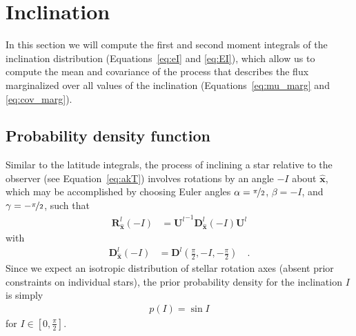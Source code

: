 \documentclass[modern]{aastex62}
\begin{document}
\section{Inclination}
\label{sec:inc}

In this section we will compute the first and second moment integrals of the
inclination distribution (Equations~\ref{eq:eI} and \ref{eq:EI}),
which allow us to compute the mean and covariance of the process
that describes the flux marginalized over all values of the inclination
(Equations~\ref{eq:mu_marg} and \ref{eq:cov_marg}).

\subsection{Probability density function}
%
Similar to the latitude integrals, the process of inclining a star relative to the
observer (see Equation~\ref{eq:akT}) involves
rotations by an angle $-I$ about $\hat{\mathbf{x}}$, which
may be accomplished by choosing
Euler angles $\alpha = \nicefrac{\pi}{2}$, $\beta = -I$, and
$\gamma = -\nicefrac{\pi}{2}$, such that
%
\begin{align}
    \mathbf{R}^l_{\hat{\mathbf{x}}}\left(-I\right)
     & =
    {\mathbf{U}^l}^{-1} \mathbf{D}^l_{\hat{\mathbf{x}}}\left(-I\right) \mathbf{U}^l
\end{align}
%
with
\begin{align}
    \mathbf{D}^l_{\hat{\mathbf{x}}}\left(-I\right)
     & =
    \mathbf{D}^l\left(\frac{\pi}{2}, -I, -\frac{\pi}{2}\right)
    \quad.
\end{align}
%
Since we expect an isotropic distribution of stellar rotation axes (absent
prior constraints on individual stars), the prior probability density for
the inclination $I$ is simply
%
\begin{align}
    p(I) = \sin I
\end{align}
%
for $I \in [0, \frac{\pi}{2}]$.
\end{document}

